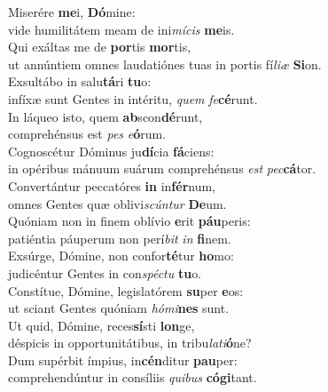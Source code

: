 \oddverse Miserére \textbf{me}i, \textbf{Dó}mine:~\*\\
\oddverse vide humilitátem meam de ini\textit{mí}\textit{cis} \textbf{me}is.\\
\evenverse Qui exáltas me de \textbf{por}tis \textbf{mor}tis,~\*\\
\evenverse ut annúntiem omnes laudatiónes tuas in portis fí\textit{li}\textit{æ} \textbf{Si}on.\\
\oddverse Exsultábo in salu\textbf{tá}ri \textbf{tu}o:~\*\\
\oddverse infíxæ sunt Gentes in intéritu, \textit{quem} \textit{fe}\textbf{cé}runt.\\
\evenverse In láqueo isto, quem \textbf{ab}scon\textbf{dé}runt,~\*\\
\evenverse comprehénsus est \textit{pes} \textit{e}\textbf{ó}rum.\\
\oddverse Cognoscétur Dóminus ju\textbf{dí}cia \textbf{fá}ciens:~\*\\
\oddverse in opéribus mánuum suárum comprehénsus \textit{est} \textit{pec}\textbf{cá}tor.\\
\evenverse Convertántur peccatóres \textbf{in} in\textbf{fér}num,~\*\\
\evenverse omnes Gentes quæ oblivi\textit{scún}\textit{tur} \textbf{De}um.\\
\oddverse Quóniam non in finem oblívio \textbf{e}rit \textbf{páu}peris:~\*\\
\oddverse patiéntia páuperum non perí\textit{bit} \textit{in} \textbf{fi}nem.\\
\evenverse Exsúrge, Dómine, non confor\textbf{té}tur \textbf{ho}mo:~\*\\
\evenverse judicéntur Gentes in con\textit{spé}\textit{ctu} \textbf{tu}o.\\
\oddverse Constítue, Dómine, legislatórem \textbf{su}per \textbf{e}os:~\*\\
\oddverse ut sciant Gentes quóniam \textit{hó}\textit{mi}\textbf{nes} sunt.\\
\evenverse Ut quid, Dómine, reces\textbf{sí}sti \textbf{lon}ge,~\*\\
\evenverse déspicis in opportunitátibus, in tribu\textit{la}\textit{ti}\textbf{ó}ne?\\
\oddverse Dum supérbit ímpius, in\textbf{cén}ditur \textbf{pau}per:~\*\\
\oddverse comprehendúntur in consíliis \textit{qui}\textit{bus} \textbf{có}\textbf{gi}tant.\\
